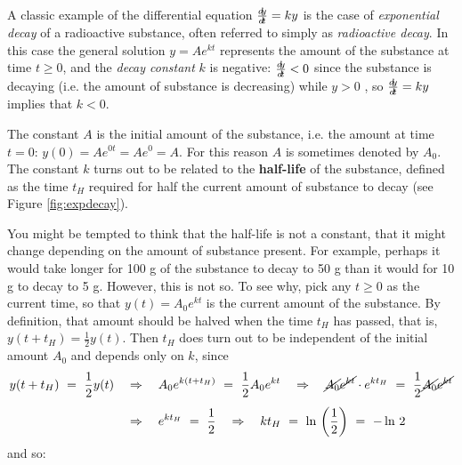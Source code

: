 \divider
\newpage
\par{}\\
\par A classic example of the differential equation $\frac{d\negmedspace y}{d\!t} = ky$ is the case of
\emph{exponential decay} of a radioactive substance,
often referred to simply as \emph{radioactive decay}.
In this case the general solution $y = Ae^{kt}$ represents the amount of the
substance at time $t \ge 0$, and the \emph{decay constant} $k$ is negative:
$\frac{d\negmedspace y}{d\!t} < 0$ since the substance is decaying (i.e. the amount of substance is
decreasing) while $y > 0$ , so $\frac{d\negmedspace y}{d\!t} = ky$ implies that $k < 0$.

\piccaption[]{\label{fig:expdecay}}
The constant $A$ is the initial amount of the substance, i.e. the amount at time
$t = 0$: $y(0) = Ae^{0t} = Ae^0 = A$. For this reason $A$ is sometimes denoted
by $A_0$. The constant $k$ turns out to be
related to the \textbf{half-life} of the substance, defined as
the time $t_H$ required for half the current amount of substance to decay (see
Figure \ref{fig:expdecay}).

You might be tempted to think that the half-life is not a constant, that it
might change depending on the amount of substance present. For example, perhaps
it would take longer for 100 g of the substance to decay to 50 g than it would
for 10 g to decay to 5 g. However, this is not so. To see why, pick any
$t \ge 0$ as the current time, so that $y(t) = A_0 e^{kt}$ is the current amount
of the substance. By definition, that amount should be halved when the time
$t_H$ has passed, that is, $y(t + t_H) = \frac{1}{2} y(t)$. Then $t_H$ does turn
out to be independent of the initial amount $A_0$ and depends only on $k$, since
\begin{align*}
 y(t + t_H) ~=~ \frac{1}{2} y(t) \quad&\Rightarrow\quad
                A_0 e^{k(t + t_H)} ~=~ \frac{1}{2} A_0 e^{kt}
   \quad\Rightarrow\quad \cancel{A_0} \cancel{e^{kt}} \cdot e^{kt_H} ~=~
                   \frac{1}{2}\cancel{A_0} \cancel{e^{kt}}\\[4pt]
 &\Rightarrow\quad e^{kt_H} ~=~ \frac{1}{2}
   \quad\Rightarrow\quad kt_H ~=~ \ln\,\left(\frac{1}{2}\right) ~=~ -\ln\,2
\end{align*}
and so:

